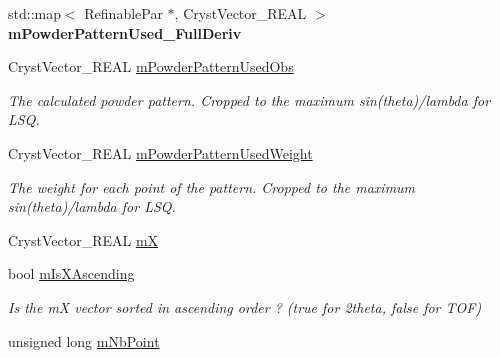 \begin{DoxyCompactItemize}
\mbox{\label{class_obj_cryst_1_1_powder_pattern_adf0c88e32cbe606f45b6ca91f816f24d}} 
std\+::map$<$ Refinable\+Par $\ast$, Cryst\+Vector\+\_\+\+R\+E\+AL $>$ {\bfseries m\+Powder\+Pattern\+Used\+\_\+\+Full\+Deriv}
\item 
\mbox{\label{class_obj_cryst_1_1_powder_pattern_a5390f7b642a104f692b459ad50de14e1}} 
Cryst\+Vector\+\_\+\+R\+E\+AL \mbox{\hyperlink{class_obj_cryst_1_1_powder_pattern_a5390f7b642a104f692b459ad50de14e1}{m\+Powder\+Pattern\+Used\+Obs}}
\begin{DoxyCompactList}\small\item\em The calculated powder pattern. Cropped to the maximum sin(theta)/lambda for L\+SQ. \end{DoxyCompactList}\item 
\mbox{\label{class_obj_cryst_1_1_powder_pattern_ab1afb9ea500e8ba4d91178033ad7d18c}} 
Cryst\+Vector\+\_\+\+R\+E\+AL \mbox{\hyperlink{class_obj_cryst_1_1_powder_pattern_ab1afb9ea500e8ba4d91178033ad7d18c}{m\+Powder\+Pattern\+Used\+Weight}}
\begin{DoxyCompactList}\small\item\em The weight for each point of the pattern. Cropped to the maximum sin(theta)/lambda for L\+SQ. \end{DoxyCompactList}\item 
Cryst\+Vector\+\_\+\+R\+E\+AL \mbox{\hyperlink{class_obj_cryst_1_1_powder_pattern_ac71a81d157387c2bdb7791cfa6d18e64}{mX}}
\item 
\mbox{\label{class_obj_cryst_1_1_powder_pattern_ae28448d544d8d581ec9ee1ff357790b0}} 
bool \mbox{\hyperlink{class_obj_cryst_1_1_powder_pattern_ae28448d544d8d581ec9ee1ff357790b0}{m\+Is\+X\+Ascending}}
\begin{DoxyCompactList}\small\item\em Is the mX vector sorted in ascending order ? (true for 2theta, false for T\+OF) \end{DoxyCompactList}\item 
\mbox{\label{class_obj_cryst_1_1_powder_pattern_a19b60b359851708470a639767f98931e}} 
unsigned long \mbox{\hyperlink{class_obj_cryst_1_1_powder_pattern_a19b60b359851708470a639767f98931e}{m\+Nb\+Point}}

\end{DoxyCompactItemize}
